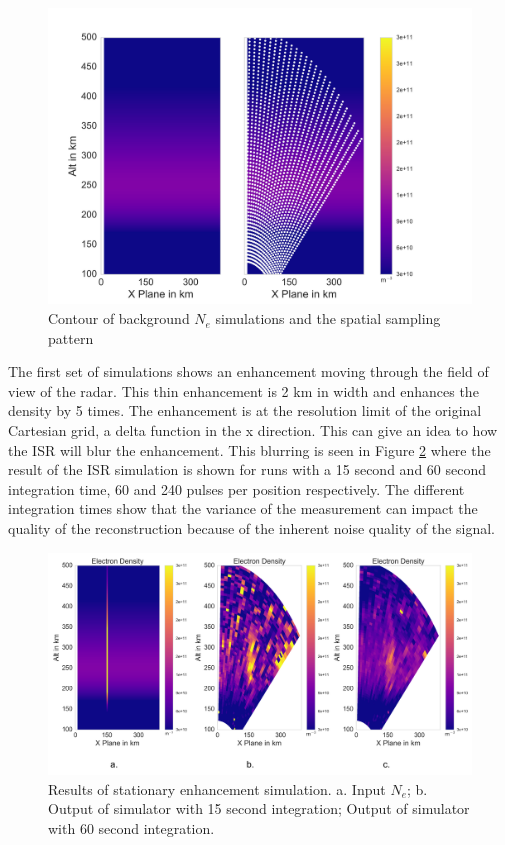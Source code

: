 \documentclass[draft,ras]{agutex}
\begin{document}
\begin{article}
\begin{figure}[!t]
\centering
\includegraphics[width=5in]{backgroundandsamp}
\caption{Contour of background $N_e$ simulations and the spatial sampling pattern}
\label{fig:background1}
\end{figure}



The first set of simulations shows an enhancement moving through the field of view of the radar. This thin enhancement is 2 km in width and enhances the density by 5 times. The enhancement is at the resolution limit of the original Cartesian grid, a delta function in the x direction. This can give an idea to how the ISR will blur the enhancement. This blurring is seen in Figure \ref{fig:stationaryall} where the result of the ISR simulation is shown for runs with a 15 second and 60 second integration time, 60 and 240 pulses per position respectively. The different integration times show that the variance of the measurement can impact the quality of the reconstruction because of the inherent noise quality of the signal.

\begin{figure}[!t]
\centering
\includegraphics[width=5in]{stationary}
\caption{Results of stationary enhancement simulation. a. Input $N_e$; b. Output of simulator with 15 second integration;  Output of simulator with 60 second integration.}
\label{fig:stationaryall}
\end{figure}


\end{article}
\end{document}
